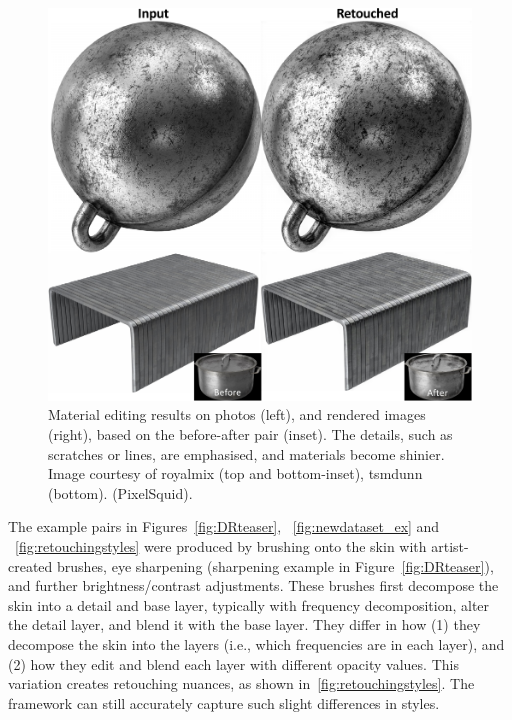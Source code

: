 \begin{figure}[th] %
	\centering
	\includegraphics[width=0.8\columnwidth]{Chapters/detail-retouching-figs/MaterialResults.pdf}
    \caption{\label{fig:material_res}Material editing results on photos (left), and rendered images (right), based on the before-after pair (inset). The details, such as scratches or lines, are emphasised, and materials become shinier. Image courtesy of royalmix (top and bottom-inset), tsmdunn (bottom). (PixelSquid).}

\end{figure}

The example pairs in Figures~\ref{fig:DRteaser}, ~\ref{fig:newdataset_ex}  and ~\ref{fig:retouchingstyles} were produced by brushing onto the skin with artist-created brushes, eye sharpening (sharpening example in Figure~\ref{fig:DRteaser}), and further brightness/contrast adjustments. These brushes first decompose the skin into a detail and base layer, typically with frequency decomposition, alter the detail layer, and blend it with the base layer. They differ in how (1) they decompose the skin into the layers (i.e., which frequencies are in each layer), and (2) how they edit and blend each layer with different opacity values. This variation creates retouching nuances, as shown in~\ref{fig:retouchingstyles}. The framework can still accurately capture such slight differences in styles. 

